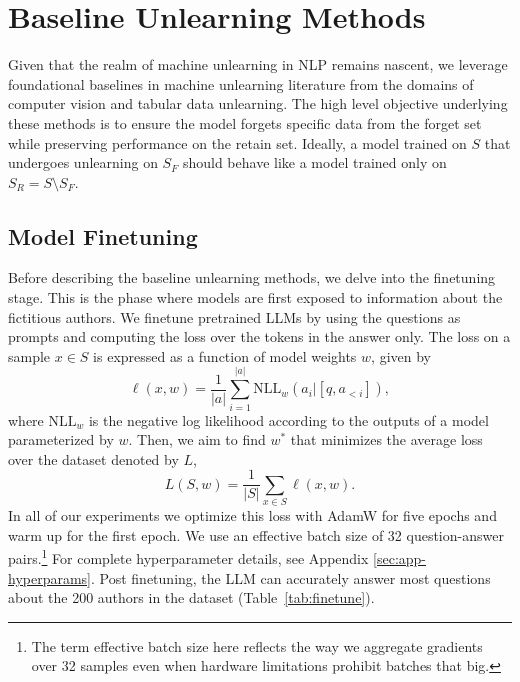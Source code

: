 \section{Baseline Unlearning Methods}
\label{subsec:methods}

Given that the realm of machine unlearning in NLP remains nascent, we leverage foundational baselines in machine unlearning literature from the domains of computer vision and tabular data unlearning. 
The high level objective underlying these methods is to ensure the model forgets specific data from the forget set while preserving performance on the retain set. 
Ideally, a model trained on $S$ that undergoes unlearning on $S_F$ should behave like a model trained only on $S_R = S\setminus S_F$. 

\subsection{Model Finetuning}
\label{sec:model-finetuning}

Before describing the baseline unlearning methods, we delve into the finetuning stage. 
This is the phase where models are first exposed to information about the fictitious authors.
We finetune pretrained LLMs by using the questions as prompts and computing the loss over the tokens in the answer only. 
The loss on a sample $x \in S$ is expressed as a function of model weights $w$, given by
\begin{equation}
\ell(x, w) = \frac{1}{\vert a \vert} \sum_{i = 1}^{\vert a \vert} \text{NLL}_w\left(a_i \big\vert [q, a_{<i}]\right),
\label{eq:loss}
\end{equation}
where $\text{NLL}_w$ is the negative log likelihood according to the outputs of a model parameterized by $w$.
Then, we aim to find $w^*$ that minimizes the average loss over the dataset denoted by $L$,
\begin{equation}
L(S, w) = \frac{1}{\vert S \vert} \sum_{x \in S}\ell(x, w). 
\end{equation}
In all of our experiments we optimize this loss with AdamW for five epochs and warm up for the first epoch.
We use an effective batch size of 32 question-answer pairs.\footnote{The term effective batch size here reflects the way we aggregate gradients over 32 samples even when hardware limitations prohibit batches that big.}
For complete hyperparameter details, see Appendix \ref{sec:app-hyperparams}.
Post finetuning, the LLM can accurately answer most questions about the 200 authors in the \tofu{} dataset (Table~\ref{tab:finetune}).

